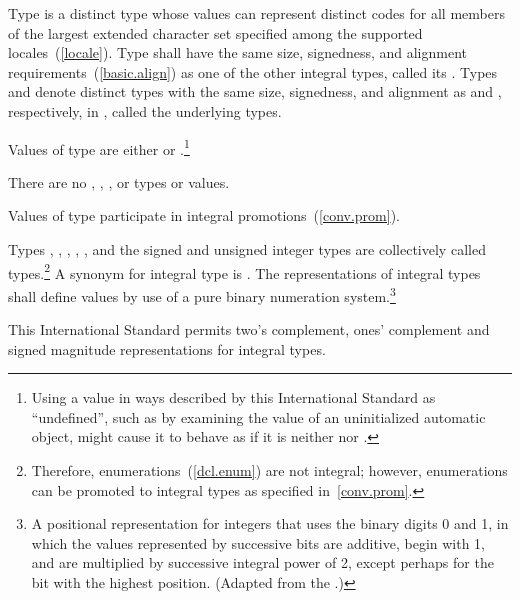 \pnum
{}%
%
%
%
%
%
%
%
%
Type  is a distinct type whose values can represent
distinct codes for all members of the largest extended character set
specified among the supported locales~(\ref{locale}). Type
 shall have the same size, signedness, and alignment
requirements~(\ref{basic.align}) as one of the other integral types,
called its . Types  and
 denote distinct types with the same size, signedness,
and alignment as  and ,
respectively, in , called the underlying types.

\pnum
{}%
Values of type  are either  or
.\footnote{Using a  value in ways described by this International
Standard as ``undefined'', such as by examining the value of an
uninitialized automatic object, might cause it to behave as if it is
neither  nor .}
\begin{note} There are no , , ,
or  types or values. \end{note} Values of type
 participate in integral promotions~(\ref{conv.prom}).

\pnum
Types , , , ,
, and the signed and unsigned integer types are
collectively called
 types.\footnote{Therefore, enumerations~(\ref{dcl.enum}) are not integral; however,
enumerations can be promoted to integral types as specified
in~\ref{conv.prom}.}
A synonym for integral type is
%
%
%
. The representations of integral types shall
define values by use of a pure binary numeration system.\footnote{A positional
representation for integers that uses the binary digits 0
and 1, in which the values represented by successive bits are additive,
begin with 1, and are multiplied by successive integral power of 2,
except perhaps for the bit with the highest position. (Adapted from the
.)}
\begin{example} This International Standard permits two's complement,
ones' complement and signed magnitude representations for integral types.
\end{example}

